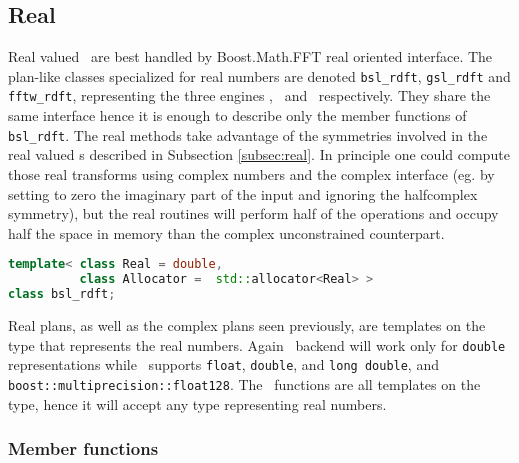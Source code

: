 \subsection{Real \dft}
Real valued \dft\ are best handled by Boost.Math.FFT real oriented
interface. The plan-like classes specialized for real numbers are denoted
\verb|bsl_rdft|, \verb|gsl_rdft| and \verb|fftw_rdft|, 
representing the three
engines \bsl, \gsl\ and \fftw\ respectively. They share the same interface hence
it is enough to describe only the member functions of \verb|bsl_rdft|.
The real methods take advantage of the symmetries involved in the real valued
\dft s described in Subsection \ref{subsec:real}. In principle one could compute
those real transforms using complex numbers and the complex interface (eg. by
setting to zero the imaginary part of the input and ignoring the halfcomplex
symmetry), but the real routines will perform
half of the operations and occupy half the space in memory than the complex
unconstrained counterpart. 
\begin{lstlisting}[language=C++,caption=Real plan.]
template< class Real = double, 
          class Allocator =  std::allocator<Real> >
class bsl_rdft;
\end{lstlisting}
Real plans, as well as the complex plans seen previously, are templates on the
type that represents the real numbers. Again \gsl\ backend will work only for
\verb|double| representations while \fftw\ supports \verb|float|, \verb|double|,
and \verb|long double|, and \verb|boost::multiprecision::float128|. 
The \bsl\ functions are all templates on the type,
hence it will accept any type representing real numbers.

\subsubsection*{Member functions}

